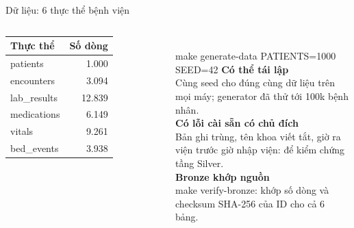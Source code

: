 \documentclass[aspectratio=169,11pt]{beamer}
\newcommand{\cmd}[1]{{\ttfamily\small\color{teal}#1}}
\begin{document}
\begin{frame}{Dữ liệu: 6 thực thể bệnh viện}
  \begin{columns}[T,onlytextwidth]
      \begin{tabular}{@{}lr@{}}
        \toprule
        \textbf{Thực thể} & \textbf{Số dòng} \\
        \midrule
        patients     & 1.000 \\
        encounters   & 3.094 \\
        lab\_results & 12.839 \\
        medications  & 6.149 \\
        vitals       & 9.261 \\
        bed\_events  & 3.938 \\
        \bottomrule
      \end{tabular}\\[4pt]
      {\scriptsize\color{muted} \cmd{make generate-data PATIENTS=1000 SEED=42}}
      \textbf{Có thể tái lập}\\
      {\small Cùng seed cho đúng cùng dữ liệu trên mọi máy; generator đã thử tới 100k bệnh nhân.}\\[8pt]
      \textbf{Có lỗi cài sẵn có chủ đích}\\
      {\small Bản ghi trùng, tên khoa viết tắt, giờ ra viện trước giờ nhập viện: để kiểm chứng tầng Silver.}\\[8pt]
      \textbf{Bronze khớp nguồn}\\
      {\small \cmd{make verify-bronze}: khớp số dòng và checksum SHA-256 của ID cho cả 6 bảng.}
  \end{columns}
\end{frame}
\end{document}
